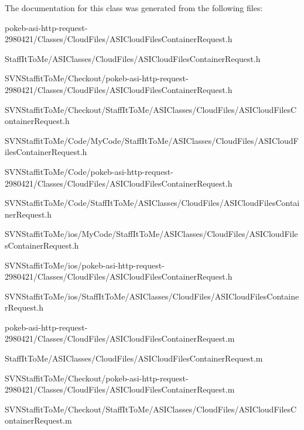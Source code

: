 \-The documentation for this class was generated from the following files\-:\begin{DoxyCompactItemize}
\item 
pokeb-\/asi-\/http-\/request-\/2980421/\-Classes/\-Cloud\-Files/\-A\-S\-I\-Cloud\-Files\-Container\-Request.\-h\item 
\-Staff\-It\-To\-Me/\-A\-S\-I\-Classes/\-Cloud\-Files/\-A\-S\-I\-Cloud\-Files\-Container\-Request.\-h\item 
\-S\-V\-N\-Staffit\-To\-Me/\-Checkout/pokeb-\/asi-\/http-\/request-\/2980421/\-Classes/\-Cloud\-Files/\-A\-S\-I\-Cloud\-Files\-Container\-Request.\-h\item 
\-S\-V\-N\-Staffit\-To\-Me/\-Checkout/\-Staff\-It\-To\-Me/\-A\-S\-I\-Classes/\-Cloud\-Files/\-A\-S\-I\-Cloud\-Files\-Container\-Request.\-h\item 
\-S\-V\-N\-Staffit\-To\-Me/\-Code/\-My\-Code/\-Staff\-It\-To\-Me/\-A\-S\-I\-Classes/\-Cloud\-Files/\-A\-S\-I\-Cloud\-Files\-Container\-Request.\-h\item 
\-S\-V\-N\-Staffit\-To\-Me/\-Code/pokeb-\/asi-\/http-\/request-\/2980421/\-Classes/\-Cloud\-Files/\-A\-S\-I\-Cloud\-Files\-Container\-Request.\-h\item 
\-S\-V\-N\-Staffit\-To\-Me/\-Code/\-Staff\-It\-To\-Me/\-A\-S\-I\-Classes/\-Cloud\-Files/\-A\-S\-I\-Cloud\-Files\-Container\-Request.\-h\item 
\-S\-V\-N\-Staffit\-To\-Me/ios/\-My\-Code/\-Staff\-It\-To\-Me/\-A\-S\-I\-Classes/\-Cloud\-Files/\-A\-S\-I\-Cloud\-Files\-Container\-Request.\-h\item 
\-S\-V\-N\-Staffit\-To\-Me/ios/pokeb-\/asi-\/http-\/request-\/2980421/\-Classes/\-Cloud\-Files/\-A\-S\-I\-Cloud\-Files\-Container\-Request.\-h\item 
\-S\-V\-N\-Staffit\-To\-Me/ios/\-Staff\-It\-To\-Me/\-A\-S\-I\-Classes/\-Cloud\-Files/\-A\-S\-I\-Cloud\-Files\-Container\-Request.\-h\item 
pokeb-\/asi-\/http-\/request-\/2980421/\-Classes/\-Cloud\-Files/\-A\-S\-I\-Cloud\-Files\-Container\-Request.\-m\item 
\-Staff\-It\-To\-Me/\-A\-S\-I\-Classes/\-Cloud\-Files/\-A\-S\-I\-Cloud\-Files\-Container\-Request.\-m\item 
\-S\-V\-N\-Staffit\-To\-Me/\-Checkout/pokeb-\/asi-\/http-\/request-\/2980421/\-Classes/\-Cloud\-Files/\-A\-S\-I\-Cloud\-Files\-Container\-Request.\-m\item 
\-S\-V\-N\-Staffit\-To\-Me/\-Checkout/\-Staff\-It\-To\-Me/\-A\-S\-I\-Classes/\-Cloud\-Files/\-A\-S\-I\-Cloud\-Files\-Container\-Request.\-m\item 

\end{DoxyCompactItemize}
